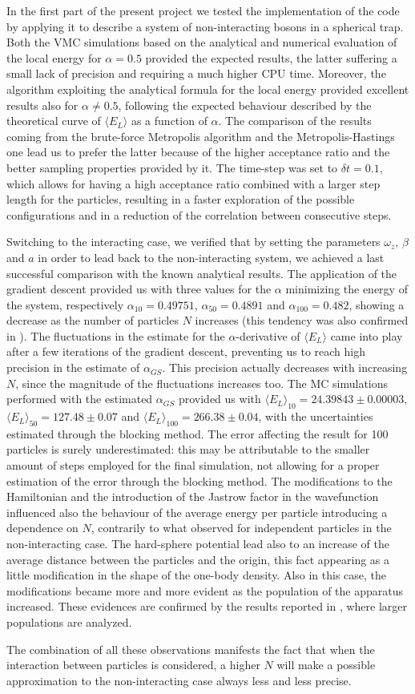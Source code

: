 In the first part of the present project we tested the implementation of the code by applying it to describe a system of non-interacting bosons in a spherical trap. Both the VMC simulations based on the analytical and numerical evaluation of the local energy for $\alpha=0.5$ provided the expected results, the latter suffering a small lack of precision and requiring a much higher CPU time. Moreover, the algorithm exploiting the analytical formula for the local energy provided excellent results also for $\alpha\neq0.5$, following the expected behaviour described by the theoretical curve of $\langle E_L \rangle$ as a function of $\alpha$. The comparison of the results coming from the brute-force Metropolis algorithm and the Metropolis-Hastings one lead us to prefer the latter because of the higher acceptance ratio and the better sampling properties provided by it. The time-step was set to $\delta t = 0.1$, which allows for having a high acceptance ratio combined with a larger step length for the particles, resulting in a faster exploration of the possible configurations and in a reduction of the correlation between consecutive steps. 

Switching to the interacting case, we verified that by setting the parameters $\omega_z$, $\beta$ and $a$ in order to lead back to the non-interacting system, we achieved a last successful comparison with the known analytical results. The application of the gradient descent provided us with three values for the $\alpha$ minimizing the energy of the system, respectively $\alpha_{10}=0.49751$, $\alpha_{50}=0.4891$ and $\alpha_{100}=0.482$, showing a decrease as the number of particles $N$ increases (this tendency was also confirmed in \cite{Nilsen2005}). The fluctuations in the estimate for the $\alpha$-derivative of $\langle E_L \rangle$ came into play after a few iterations of the gradient descent, preventing us to reach high precision in the estimate of $\alpha_{GS}$. This precision actually decreases with increasing $N$, since the magnitude of the fluctuations increases too. The MC simulations performed with the estimated $\alpha_{GS}$ provided us with $\langle E_L \rangle_{10} = 24.39843 \pm 0.00003$, $\langle E_L \rangle_{50} = 127.48 \pm 0.07$ and $\langle E_L \rangle_{100} = 266.38 \pm 0.04$, with the uncertainties estimated through the blocking method. The error affecting the result for 100 particles is surely underestimated: this may be attributable to the smaller amount of steps employed for the final simulation, not allowing for a proper estimation of the error through the blocking method. The modifications to the Hamiltonian and the introduction of the Jastrow factor in the wavefunction influenced also the behaviour of the average energy per particle introducing a dependence on $N$, contrarily to what observed for independent particles in the non-interacting case. The hard-sphere potential lead also to an increase of the average distance between the particles and the origin, this fact appearing as a little modification in the shape of the one-body density. Also in this case, the modifications became more and more evident as the population of the apparatus increased. These evidences are confirmed by the results reported in \cite{duBois}, where larger populations are analyzed.

The combination of all these observations manifests the fact that when the interaction between particles is considered, a higher $N$ will make a possible approximation to the non-interacting case always less and less precise.